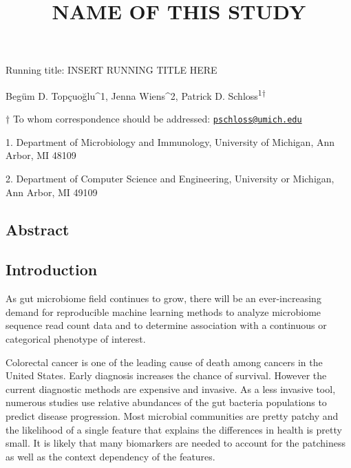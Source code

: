 \documentclass[11pt,]{article}
\title{\textbf{NAME OF THIS STUDY}}
\author{}
\date{}
\begin{document}
\maketitle

\vspace{35mm}

Running title: INSERT RUNNING TITLE HERE

\vspace{35mm}

Begüm D. Topçuoğlu\^{}1, Jenna Wiens\^{}2, Patrick D.
Schloss\textsuperscript{1\(\dagger\)}

\vspace{40mm}

\(\dagger\) To whom correspondence should be addressed:
\href{mailto:pschloss@umich.edu}{\nolinkurl{pschloss@umich.edu}}

1. Department of Microbiology and Immunology, University of Michigan,
Ann Arbor, MI 48109

2. Department of Computer Science and Engineering, University or
Michigan, Ann Arbor, MI 49109

\newpage

\linenumbers

\subsection{Abstract}\label{abstract}

\newpage

\subsection{Introduction}\label{introduction}

As gut microbiome field continues to grow, there will be an
ever-increasing demand for reproducible machine learning methods to
analyze microbiome sequence read count data and to determine association
with a continuous or categorical phenotype of interest.

Colorectal cancer is one of the leading cause of death among cancers in
the United States. Early diagnosis increases the chance of survival.
However the current diagnostic methods are expensive and invasive. As a
less invasive tool, numerous studies use relative abundances of the gut
bacteria populations to predict disease progression. Most microbial
communities are pretty patchy and the likelihood of a single feature
that explains the differences in health is pretty small. It is likely
that many biomarkers are needed to account for the patchiness as well as
the context dependency of the features.
\end{document}
